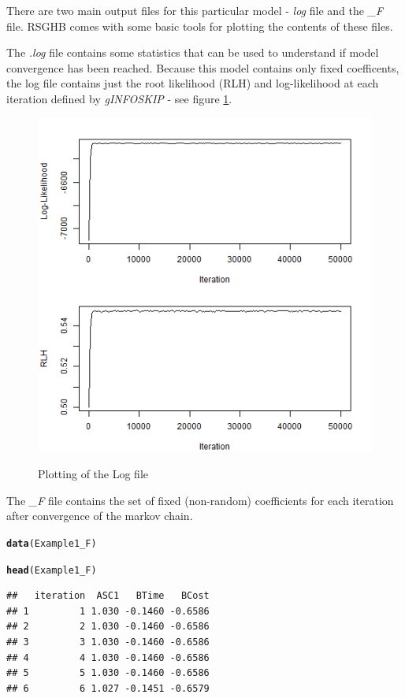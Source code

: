 \documentclass{article}\usepackage{graphicx, color}
\makeatletter
\newcommand{\hlfunctioncall}[1]{\textcolor[rgb]{0.501960784313725,0,0.329411764705882}{\textbf{#1}}}%
\newenvironment{kframe}{%
 \def\at@end@of@kframe{}%
 \ifinner\ifhmode%
  \def\at@end@of@kframe{\end{minipage}}%
  \begin{minipage}{\columnwidth}%
 \fi\fi%
 \def\FrameCommand##1{\hskip\@totalleftmargin \hskip-\fboxsep
 \colorbox{shadecolor}{##1}\hskip-\fboxsep
     \hskip-\linewidth \hskip-\@totalleftmargin \hskip\columnwidth}%
 \MakeFramed {\advance\hsize-\width
   \@totalleftmargin\z@ \linewidth\hsize
   \@setminipage}}%
 {\par\unskip\endMakeFramed%
 \at@end@of@kframe}
\newenvironment{knitrout}{}{} %
\makeatother
\begin{document}
There are two main output files for this particular model - \emph{log} file and the \emph{\_F} file. RSGHB comes with some basic tools for plotting the contents of these files.

The \emph{.log} file contains some statistics that can be used to understand if model convergence has been reached. Because this model contains only fixed coefficents, the log file contains just the root likelihood (RLH) and log-likelihood at each iteration defined by \emph{gINFOSKIP} - see figure \ref{logfile1}.

\begin{figure}
\caption{Plotting of the Log file}
\includegraphics[scale=0.50]{MNL_logPlot1.png}
\label{logfile1}
\end{figure}

The \emph{\_F} file contains the set of fixed (non-random) coefficients for each iteration after convergence of the markov chain.

\begin{knitrout}
\color{fgcolor}\begin{kframe}
\begin{alltt}

\hlfunctioncall{data}(Example1_F)

\hlfunctioncall{head}(Example1_F)
\end{alltt}
\begin{verbatim}
##   iteration  ASC1   BTime   BCost
## 1         1 1.030 -0.1460 -0.6586
## 2         2 1.030 -0.1460 -0.6586
## 3         3 1.030 -0.1460 -0.6586
## 4         4 1.030 -0.1460 -0.6586
## 5         5 1.030 -0.1460 -0.6586
## 6         6 1.027 -0.1451 -0.6579
\end{verbatim}
\end{kframe}
\end{knitrout}
\end{document}
